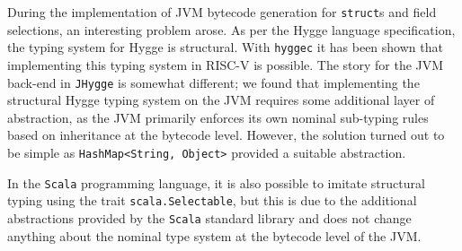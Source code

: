 During the implementation of JVM bytecode generation for \texttt{struct}s and field selections, an interesting problem arose.
As per the Hygge language specification, the typing system for Hygge is structural. With \texttt{hyggec} it has been shown
that implementing this typing system in RISC-V is possible. The story for the JVM back-end in \texttt{JHygge} is somewhat different;
we found that implementing the structural Hygge typing system on the JVM requires some additional layer of abstraction, as
the JVM primarily enforces its own nominal sub-typing rules based on inheritance at the bytecode level.
However, the solution turned out to be simple as \texttt{HashMap<String, Object>}\cite{hashmap} provided a suitable abstraction.

In the \texttt{Scala} programming language, it is also possible to imitate structural typing using the trait \texttt{scala.Selectable}\cite{scala3}, but this is
due to the additional abstractions provided by the \texttt{Scala} standard library and does not change anything about the nominal
type system at the bytecode level of the JVM.

